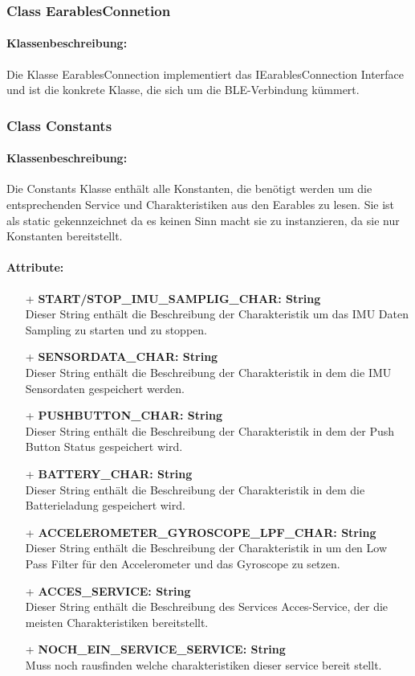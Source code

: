\documentclass[a4paper,12pt]{article}
\begin{document}
\subsubsection{Class EarablesConnetion}

\paragraph{Klassenbeschreibung:}
Die Klasse EarablesConnection implementiert das IEarablesConnection Interface und ist die konkrete Klasse, die sich um die BLE-Verbindung kümmert.


\subsubsection{Class Constants}
\paragraph{Klassenbeschreibung:}
Die Constants Klasse enthält alle Konstanten, die benötigt werden um die entsprechenden Service und Charakteristiken aus den Earables zu lesen. Sie ist als static gekennzeichnet da es keinen Sinn macht sie zu instanzieren, da sie nur Konstanten bereitstellt.

\paragraph{Attribute:}
\begin{itemize}
	\item[+] \textbf{START/STOP\_IMU\_SAMPLIG\_CHAR: String}\\Dieser String enthält die Beschreibung der Charakteristik um das IMU Daten Sampling zu starten und zu stoppen.
	\item[+] \textbf{SENSORDATA\_CHAR: String}\\Dieser String enthält die Beschreibung der Charakteristik in dem die IMU Sensordaten gespeichert werden.
	\item[+] \textbf{PUSHBUTTON\_CHAR: String}\\Dieser String enthält die Beschreibung der Charakteristik in dem der Push Button Status gespeichert wird.
	\item[+] \textbf{BATTERY\_CHAR: String}\\Dieser String enthält die Beschreibung der Charakteristik in dem die Batterieladung gespeichert wird.
	\item[+] \textbf{ACCELEROMETER\_GYROSCOPE\_LPF\_CHAR: String}\\Dieser String enthält die Beschreibung der Charakteristik in um den Low Pass Filter für den Accelerometer und das Gyroscope zu setzen.
\item[+] \textbf{ACCES\_SERVICE: String}\\Dieser String enthält die Beschreibung des Services Acces-Service, der die meisten Charakteristiken bereitstellt.
\item[+] \textbf{NOCH\_EIN\_SERVICE\_SERVICE: String}\\Muss noch rausfinden welche charakteristiken dieser service bereit stellt.
\end{itemize}
\end{document}
